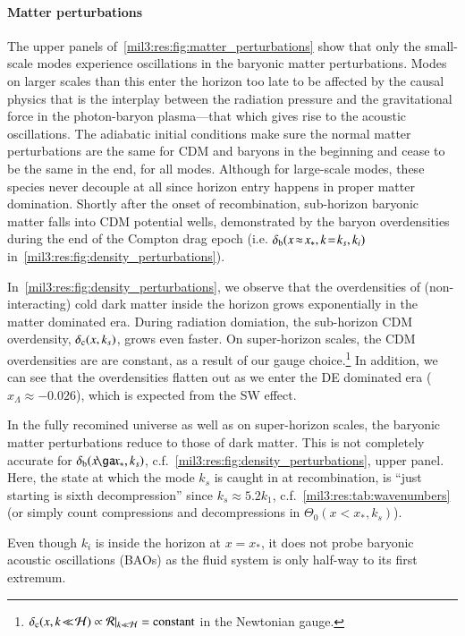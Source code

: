 \paragraph{Matter perturbations}
The upper panels of~\cref{mil3:res:fig:matter_perturbations} show that only the small-scale modes experience oscillations in the baryonic matter perturbations. Modes on larger scales than this enter the horizon too late to be affected by the causal physics that is the interplay between the radiation pressure and the gravitational force in the photon-baryon plasma---that which gives rise to the acoustic oscillations. The adiabatic initial conditions make sure the normal matter perturbations are the same for CDM and baryons in the beginning and cease to be the same in the end, for all modes. Although for large-scale modes, these species never decouple at all since horizon entry happens in proper matter domination. Shortly after the onset of recombination, sub-horizon baryonic matter falls into CDM potential wells, demonstrated by the baryon overdensities during the end of the Compton drag epoch (i.e. $\delta_\mathrm{b}(x\!\approx\!x_*, k\!=\!k_s, k_i)$ in~\cref{mil3:res:fig:density_perturbations}). 

In~\cref{mil3:res:fig:density_perturbations}, we observe that the overdensities of (non-interacting) cold dark matter inside the horizon grows exponentially in the matter dominated era. During radiation domiation, the sub-horizon CDM overdensity, $\delta_\mathrm{c}(x, k_s)$, grows even faster. On super-horizon scales, the CDM overdensities are are constant, as a result of our gauge choice.\footnote{$\delta_\mathrm{c}(x, k\!\ll\! \mathcal{H}) \propto \mathcal{R}|_{k\ll \mathcal{H}} = \text{constant}$ in the Newtonian gauge.} In addition, we can see that the overdensities flatten out as we enter the DE dominated era ($x_\Lambda\approx -0.026$), which is expected from the SW effect.

In the fully recomined universe as well as on super-horizon scales, the baryonic matter perturbations reduce to those of dark matter. This is not completely accurate for $\delta\ped{b}(x\!\ga\!x_*,k_s)$, c.f.~\cref{mil3:res:fig:density_perturbations}, upper panel. Here, the state at which the mode $k_s$ is caught in at recombination, is ``just starting is sixth decompression'' since $k_s\approx 5.2 k_1$, c.f.~\cref{mil3:res:tab:wavenumbers} (or simply count compressions and decompressions in $\Theta_0(x\!<\!x_*, k_s)$). 

Even though $k_i$ is inside the horizon at $x=x_*$, it does not probe baryonic acoustic oscillations (BAOs) as the fluid system is only half-way to its first extremum. %

